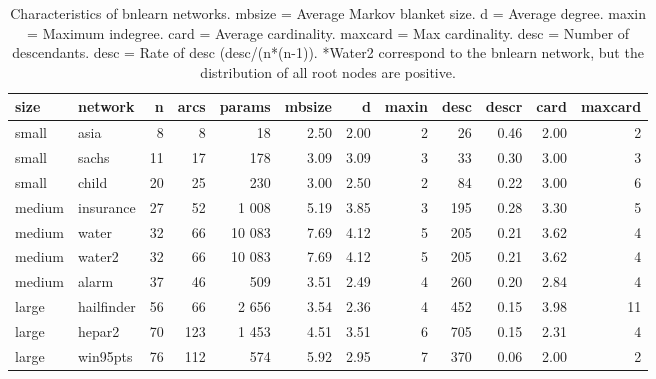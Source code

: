 \begin{table}[ht]
\centering
\begingroup\footnotesize
\begin{tabularx}{\textwidth}{llrrrrrrrrrr}
  \toprule
size & network & n & arcs & params & mbsize & d & maxin & desc & descr & card & maxcard \\ 
  \midrule
small  & asia       &  8 &   8 &     18 & 2.50 & 2.00 & 2 &  26 & 0.46 & 2.00 &  2 \\ 
  small  & sachs      & 11 &  17 &    178 & 3.09 & 3.09 & 3 &  33 & 0.30 & 3.00 &  3 \\ 
  small  & child      & 20 &  25 &    230 & 3.00 & 2.50 & 2 &  84 & 0.22 & 3.00 &  6 \\ 
   \addlinespace[0.5em]medium & insurance  & 27 &  52 &  1 008 & 5.19 & 3.85 & 3 & 195 & 0.28 & 3.30 &  5 \\ 
  medium & water      & 32 &  66 & 10 083 & 7.69 & 4.12 & 5 & 205 & 0.21 & 3.62 &  4 \\ 
  medium & water2     & 32 &  66 & 10 083 & 7.69 & 4.12 & 5 & 205 & 0.21 & 3.62 &  4 \\ 
  medium & alarm      & 37 &  46 &    509 & 3.51 & 2.49 & 4 & 260 & 0.20 & 2.84 &  4 \\ 
   \addlinespace[0.5em]large  & hailfinder & 56 &  66 &  2 656 & 3.54 & 2.36 & 4 & 452 & 0.15 & 3.98 & 11 \\ 
  large  & hepar2     & 70 & 123 &  1 453 & 4.51 & 3.51 & 6 & 705 & 0.15 & 2.31 &  4 \\ 
  large  & win95pts   & 76 & 112 &    574 & 5.92 & 2.95 & 7 & 370 & 0.06 & 2.00 &  2 \\ 
   \bottomrule
\end{tabularx}
\endgroup
\caption{Characteristics of bnlearn networks. mbsize = Average Markov blanket size. d = Average degree. maxin = Maximum indegree. card = Average cardinality. maxcard = Max cardinality. desc = Number of descendants. desc = Rate of desc (desc/(n*(n-1)). *Water2 correspond to the bnlearn network, but the distribution of all root nodes are positive.} 
\end{table}
